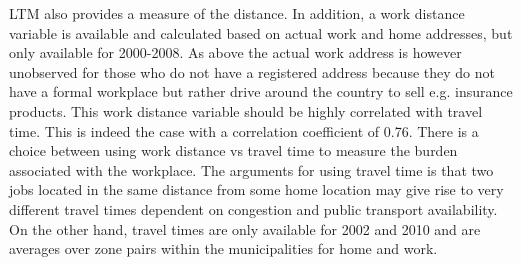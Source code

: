 LTM also provides a measure of the distance. In addition, a work distance variable is available and calculated based on actual work and home addresses, but only available for 2000-2008. As above the actual work address is however unobserved for those who do not have a registered address because they do not have a formal workplace but rather drive around the country to sell e.g. insurance products. This work distance variable should be highly correlated with travel time. This is indeed the case with a correlation coefficient of 0.76. There is a choice between using work distance vs travel time to measure the burden associated with the workplace. The arguments for using travel time is that two jobs located in the same distance from some home location may give rise to very different travel times dependent on congestion and public transport availability. On the other hand, travel times are only available for 2002 and 2010 and are averages over zone pairs within the municipalities for home and work. %

